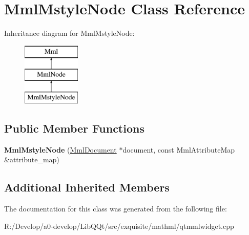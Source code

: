 \hypertarget{class_mml_mstyle_node}{}\section{Mml\+Mstyle\+Node Class Reference}
\label{class_mml_mstyle_node}
Inheritance diagram for Mml\+Mstyle\+Node\+:\begin{figure}[H]
\begin{center}
\leavevmode
\includegraphics[height=3.000000cm]{class_mml_mstyle_node}
\end{center}
\end{figure}
\subsection*{Public Member Functions}
\begin{DoxyCompactItemize}
\item 
\mbox{\label{class_mml_mstyle_node_ad46791b6c69a593bb0c5bf9157139cf7}} 
{\bfseries Mml\+Mstyle\+Node} (\mbox{\hyperlink{class_mml_document}{Mml\+Document}} $\ast$document, const Mml\+Attribute\+Map \&attribute\+\_\+map)
\end{DoxyCompactItemize}
\subsection*{Additional Inherited Members}


The documentation for this class was generated from the following file\+:\begin{DoxyCompactItemize}
\item 
R\+:/\+Develop/a0-\/develop/\+Lib\+Q\+Qt/src/exquisite/mathml/qtmmlwidget.\+cpp\end{DoxyCompactItemize}

